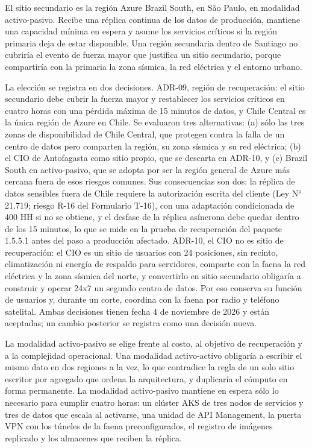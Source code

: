\documentclass[subdoc]{../../comun/overfore}
\begin{document}
El sitio secundario es la región Azure Brazil South, en São Paulo, en modalidad activo-pasivo. Recibe una réplica continua de los datos de producción, mantiene una capacidad mínima en espera y asume los servicios críticos si la región primaria deja de estar disponible. Una región secundaria dentro de Santiago no cubriría el evento de fuerza mayor que justifica un sitio secundario, porque compartiría con la primaria la zona sísmica, la red eléctrica y el entorno urbano.

La elección se registra en dos decisiones. ADR-09, región de recuperación: el sitio secundario debe cubrir la fuerza mayor y restablecer los servicios críticos en cuatro horas con una pérdida máxima de 15 minutos de datos, y Chile Central es la única región de Azure en Chile. Se evaluaron tres alternativas: (a) sólo las tres zonas de disponibilidad de Chile Central, que protegen contra la falla de un centro de datos pero comparten la región, su zona sísmica y su red eléctrica; (b) el CIO de Antofagasta como sitio propio, que se descarta en ADR-10, y (c) Brazil South en activo-pasivo, que se adopta por ser la región general de Azure más cercana fuera de esos riesgos comunes. Sus consecuencias son dos: la réplica de datos sensibles fuera de Chile requiere la autorización escrita del cliente (Ley N° 21.719; riesgo R-16 del Formulario T-16), con una adaptación condicionada de 400 HH si no se obtiene, y el desfase de la réplica asíncrona debe quedar dentro de los 15 minutos, lo que se mide en la prueba de recuperación del paquete 1.5.5.1 antes del paso a producción afectado. ADR-10, el CIO no es sitio de recuperación: el CIO es un sitio de usuarios con 24 posiciones, sin recinto, climatización ni energía de respaldo para servidores, comparte con la faena la red eléctrica y la zona sísmica del norte, y convertirlo en sitio secundario obligaría a construir y operar 24x7 un segundo centro de datos. Por eso conserva su función de usuarios y, durante un corte, coordina con la faena por radio y teléfono satelital. Ambas decisiones tienen fecha 4 de noviembre de 2026 y están aceptadas; un cambio posterior se registra como una decisión nueva.

La modalidad activo-pasivo se elige frente al costo, al objetivo de recuperación y a la complejidad operacional. Una modalidad activo-activo obligaría a escribir el mismo dato en dos regiones a la vez, lo que contradice la regla de un solo sitio escritor por agregado que ordena la arquitectura, y duplicaría el cómputo en forma permanente. La modalidad activo-pasivo mantiene en espera sólo lo necesario para cumplir cuatro horas: un clúster AKS de tres nodos de servicios y tres de datos que escala al activarse, una unidad de API Management, la puerta VPN con los túneles de la faena preconfigurados, el registro de imágenes replicado y los almacenes que reciben la réplica.
\end{document}
